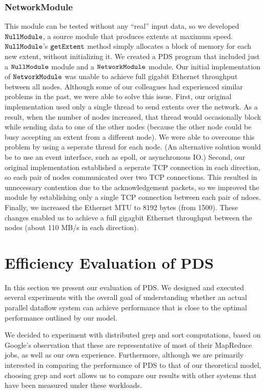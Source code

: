 \documentclass{acm_proc_article-sp}
\begin{document}
\subsubsection{NetworkModule}
  
This module can be tested without any ``real''  
  input data, so we developed $\tt NullModule$, a source module that produces
  extents at maximum speed. $\tt NullModule$'s $\tt getExtent$ method simply allocates  
  a block of memory for each new extent, without initializing it. We created a  
  PDS program that included just a $\tt NullModule$ module and a $\tt  
  NetworkModule$ module. Our initial implementation of $\tt NetworkModule$ was  
  unable to achieve full gigabit Ethernet throughput between all nodes.  
  Although some of our colleagues had experienced similar problems in the past,  
  we were able to solve this issue. First, our original implementation used only
  a single thread to send extents over the network. As a result, when the number of  
  nodes increased, that thread would occasionally block while sending data to  
  one of the other nodes (because the other node could be busy accepting an
  extent from a different node). We were able to overcome this problem by using a
  seperate thread for each node. (An alternative solution would be to use an
  event interface, such as epoll, or asynchronous IO.) Second, our original
  implementation established a seperate TCP connection in each direction, so
  each pair of nodes communicated over two TCP connections. This resulted in
  unnecessary contention due to the acknowledgement packets, so we improved the
  module by establishing only a single TCP connection between each pair of
  ndoes. Finally, we increased the Ethernet MTU to 8192 bytes (from 1500). These changes enabled us to achieve a full gigagbit Ethernet throughput between the nodes
  (about 110 MB/s in each direction).


\section{Efficiency Evaluation of PDS}


In this section we present our evaluation of PDS. We designed and executed
several experiments with the overall goal of understanding whether an actual
parallel dataflow system can achieve performance that is close to the optimal
performance outlined by our model.

We decided to experiment with distributed grep and sort computations, based on
Google's observation that these are representative of most of their MapReduce
jobs, as well as our own experience. Furthermore, although we are primarily
interested in comparing the performance of PDS to that of our theoretical
model, choosing grep and sort allows us to compare our results with other
systems that have been measured under these workloads.
\end{document}
